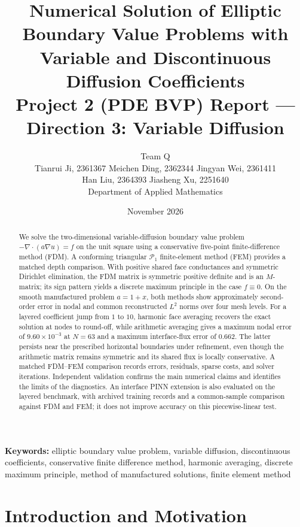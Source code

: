 \documentclass[11pt,a4paper]{article}
\title{\textbf{Numerical Solution of Elliptic Boundary Value Problems with Variable and Discontinuous Diffusion Coefficients}\\[2mm]
\large Project 2 (PDE BVP) Report --- Direction 3: Variable Diffusion}
\author{
    Team Q \\
    \small Tianrui Ji, 2361367 \quad Meichen Ding, 2362344 \quad Jingyan Wei, 2361411 \\
    \small Han Liu, 2364393 \quad Jiasheng Xu, 2251640 \\
    \small Department of Applied Mathematics
}
\date{November 2026}
\theoremstyle{definition}
\theoremstyle{remark}
\begin{document}
\maketitle

\begin{abstract}
We solve the two-dimensional variable-diffusion boundary value problem
$-\nabla\cdot(a\nabla u)=f$ on the unit square using a conservative five-point
finite-difference method (FDM). A conforming triangular $\mathcal P_1$
finite-element method (FEM) provides a matched depth comparison. With positive
shared face conductances and symmetric Dirichlet elimination, the FDM matrix is
symmetric positive definite and is an $M$-matrix; its sign pattern yields a
discrete maximum principle in the case $f\equiv 0$. On the
smooth manufactured problem $a=1+x$, both methods show approximately second-order
error in nodal and common reconstructed $L^2$ norms over four mesh levels.
For a layered coefficient jump from $1$ to $10$, harmonic face averaging recovers
the exact solution at nodes to round-off, while arithmetic averaging gives a
maximum nodal error of $9.60\times10^{-3}$ at $N=63$ and a maximum interface-flux
error of $0.662$. The latter persists near the prescribed horizontal boundaries
under refinement, even though the arithmetic matrix remains symmetric and its
shared flux is locally conservative. A matched FDM--FEM comparison records errors,
residuals, sparse costs, and solver iterations. Independent validation confirms
the main numerical claims and identifies the limits of the diagnostics.
An interface PINN extension is also evaluated on the layered benchmark,
with archived training records and a common-sample comparison against FDM
and FEM; it does not improve accuracy on this piecewise-linear test.
\end{abstract}

\noindent\textbf{Keywords:} elliptic boundary value problem, variable diffusion, discontinuous coefficients, conservative finite difference method, harmonic averaging, discrete maximum principle, method of manufactured solutions, finite element method

\clearpage
\tableofcontents
\newpage

\section{Introduction and Motivation}
\end{document}
